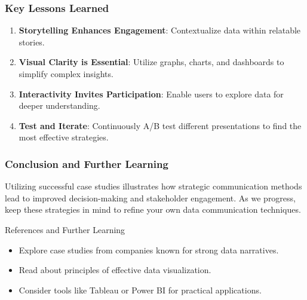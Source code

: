 \documentclass{beamer}
\begin{document}
\begin{frame}[fragile]
    \frametitle{Key Lessons Learned}
    \begin{enumerate}
        \item \textbf{Storytelling Enhances Engagement}: Contextualize data within relatable stories.
        \item \textbf{Visual Clarity is Essential}: Utilize graphs, charts, and dashboards to simplify complex insights.
        \item \textbf{Interactivity Invites Participation}: Enable users to explore data for deeper understanding.
        \item \textbf{Test and Iterate}: Continuously A/B test different presentations to find the most effective strategies.
    \end{enumerate}
\end{frame}

\begin{frame}[fragile]
    \frametitle{Conclusion and Further Learning}
    Utilizing successful case studies illustrates how strategic communication methods lead to improved decision-making and stakeholder engagement. 
    As we progress, keep these strategies in mind to refine your own data communication techniques.

    \begin{block}{References and Further Learning}
        \begin{itemize}
            \item Explore case studies from companies known for strong data narratives.
            \item Read about principles of effective data visualization.
            \item Consider tools like Tableau or Power BI for practical applications.
        \end{itemize}
    \end{block}
\end{frame}
\end{document}
